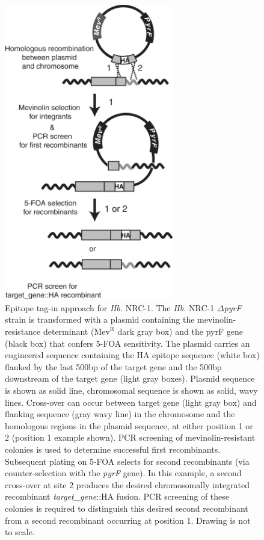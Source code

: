 \begin{figure}
\centering
\includegraphics[width=20em]{SaltyBugs/figures/fig1}
\caption{Epitope tag-in approach for {\em Hb.} NRC-1. The {\em Hb.} NRC-1 $\Delta${\em pyrF} strain is transformed with a plasmid containing the mevinolin-resistance determinant ($\mathrm{Mev}^{\mathrm{R}}$ dark gray box) and the pyrF gene (black box) that confers 5-FOA sensitivity. The plasmid carries an engineered sequence containing the HA epitope sequence (white box) flanked by the last 500bp of the target gene and the 500bp downstream of the target gene (light gray boxes). Plasmid sequence is shown as solid line, chromosomal sequence is shown as solid, wavy lines. Cross-over can occur between target gene (light gray box) and flanking sequence (gray wavy line) in the chromosome and the homologous regions in the plasmid sequence, at either position 1 or 2 (position 1 example shown). PCR screening of mevinolin-resistant colonies is used to determine successful first recombinants. Subsequent plating on 5-FOA selects for second recombinants (via counter-selection with the {\em pyrF} gene). In this example, a second cross-over at site 2 produces the desired chromosomally integrated recombinant {\em target\_gene}::HA fusion. PCR screening of these colonies is required to distinguish this desired second recombinant from a second recombinant occurring at position 1. Drawing is not to scale.}
\label{SB_fig1}
\end{figure}

